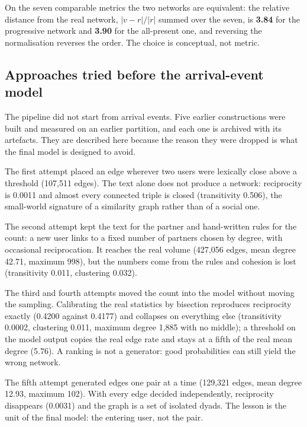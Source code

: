 \documentclass[11pt,a4paper]{article}
\begin{document}
On the seven comparable metrics the two networks are equivalent: the relative distance from the real
network, $\lvert v - r\rvert / \lvert r \rvert$ summed over the seven, is \textbf{3.84} for the progressive
network and \textbf{3.90} for the all-present one, and reversing the normalisation reverses the order. The
choice is conceptual, not metric.

\subsection{Approaches tried before the arrival-event model}
The pipeline did not start from arrival events. Five earlier constructions were built and measured on an
earlier partition, and each one is archived with its artefacts. They are described here because the reason
they were dropped is what the final model is designed to avoid.

The first attempt placed an edge wherever two users were lexically close above a threshold (107,511 edges).
The text alone does not produce a network: reciprocity is 0.0011 and almost every connected triple is
closed (transitivity 0.506), the small-world signature of a similarity graph rather than of a social one.

The second attempt kept the text for the partner and hand-written rules for the count: a new user links to
a fixed number of partners chosen by degree, with occasional reciprocation. It reaches the real volume
(427,056 edges, mean degree 42.71, maximum 998), but the numbers come from the rules and cohesion is lost
(transitivity 0.011, clustering 0.032).

The third and fourth attempts moved the count into the model without moving the sampling. Calibrating the
real statistics by bisection reproduces reciprocity exactly (0.4200 against 0.4177) and collapses on
everything else (transitivity 0.0002, clustering 0.011, maximum degree 1,885 with no middle); a threshold on
the model output copies the real edge rate and stays at a fifth of the real mean degree (5.76). A ranking is
not a generator: good probabilities can still yield the wrong network.

The fifth attempt generated edges one pair at a time (129,321 edges, mean degree 12.93, maximum 102). With
every edge decided independently, reciprocity disappears (0.0031) and the graph is a set of isolated dyads.
The lesson is the unit of the final model: the entering user, not the pair.
\end{document}
